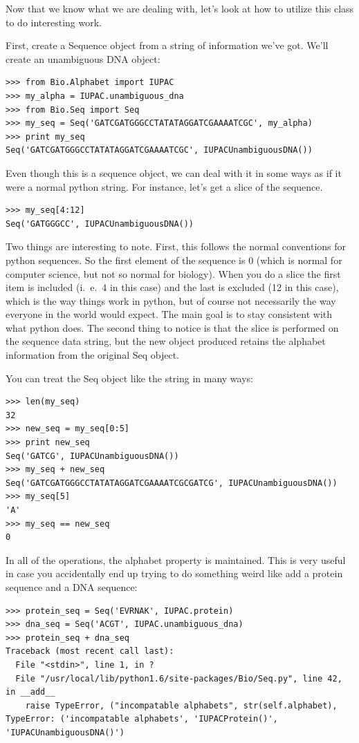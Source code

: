 \documentclass{report}
\begin{document}
Now that we know what we are dealing with, let's look at how to utilize this class to do interesting work.


First, create a Sequence object from a string of information we've got. We'll create an unambiguous DNA object:

\begin{verbatim}
>>> from Bio.Alphabet import IUPAC
>>> my_alpha = IUPAC.unambiguous_dna
>>> from Bio.Seq import Seq
>>> my_seq = Seq('GATCGATGGGCCTATATAGGATCGAAAATCGC', my_alpha)
>>> print my_seq
Seq('GATCGATGGGCCTATATAGGATCGAAAATCGC', IUPACUnambiguousDNA())
\end{verbatim}


Even though this is a sequence object, we can deal with it in some ways as if it were a normal python string. For instance, let's get a slice of the sequence.

\begin{verbatim}
>>> my_seq[4:12]
Seq('GATGGGCC', IUPACUnambiguousDNA())
\end{verbatim}

Two things are interesting to note. First, this follows the normal conventions for python sequences.  So the first element of the sequence is 0 (which is normal for computer science, but not so normal for biology). When you do a slice the first item is included (i.~e.~4 in this case) and the last is excluded (12 in this case), which is the way things work in python, but of course not necessarily the way everyone in the world would expect. The main goal is to stay consistent with what python does. The second thing to notice is that the slice is performed on the sequence data string, but the new object produced retains the alphabet information from the original Seq object.


You can treat the Seq object like the string in many ways:

\begin{verbatim}
>>> len(my_seq)
32
>>> new_seq = my_seq[0:5]
>>> print new_seq
Seq('GATCG', IUPACUnambiguousDNA())
>>> my_seq + new_seq
Seq('GATCGATGGGCCTATATAGGATCGAAAATCGCGATCG', IUPACUnambiguousDNA())
>>> my_seq[5]
'A'
>>> my_seq == new_seq
0
\end{verbatim}

In all of the operations, the alphabet property is maintained. This is very useful in case you accidentally end up trying to do something weird like add a protein sequence and a DNA sequence:

\begin{verbatim}
>>> protein_seq = Seq('EVRNAK', IUPAC.protein)
>>> dna_seq = Seq('ACGT', IUPAC.unambiguous_dna)
>>> protein_seq + dna_seq
Traceback (most recent call last):
  File "<stdin>", line 1, in ?
  File "/usr/local/lib/python1.6/site-packages/Bio/Seq.py", line 42, in __add__
    raise TypeError, ("incompatable alphabets", str(self.alphabet),
TypeError: ('incompatable alphabets', 'IUPACProtein()', 'IUPACUnambiguousDNA()')
\end{verbatim}
\end{document}
